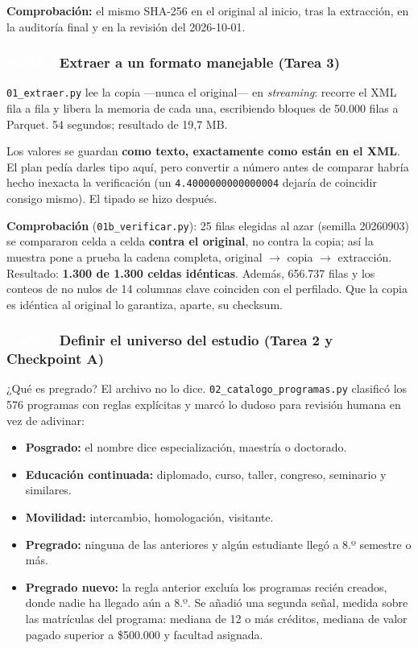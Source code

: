 \documentclass[11pt,a4paper,twoside,twocolumn]{article}
\newcommand{\cod}[1]{\nolinkurl{#1}}
\newcommand{\paso}[2]{\subsubsection*{\colorbox{ustaAzul}{\textcolor{white}{\scriptsize\sffamily\bfseries PASO #1}}\enspace #2}}
\begin{document}
\textbf{Comprobación:} el mismo SHA-256 en el original al inicio, tras la extracción, en la
auditoría final y en la revisión del 2026-10-01.

\paso{2}{Extraer a un formato manejable (Tarea 3)}

\cod{01_extraer.py} lee la copia ---nunca el original--- en \emph{streaming}: recorre el XML fila
a fila y libera la memoria de cada una, escribiendo bloques de 50.000 filas a Parquet.
54 segundos; resultado de 19,7 MB.

Los valores se guardan \textbf{como texto, exactamente como están en el XML}. El plan pedía darles
tipo aquí, pero convertir a número antes de comparar habría hecho inexacta la verificación (un
\cod{4.4000000000000004} dejaría de coincidir consigo mismo). El tipado se hizo después.

\textbf{Comprobación} (\cod{01b_verificar.py}): 25 filas elegidas al azar (semilla 20260903) se
compararon celda a celda \textbf{contra el original}, no contra la copia; así la muestra pone a
prueba la cadena completa, original $\to$ copia $\to$ extracción. Resultado: \textbf{1.300 de
1.300 celdas idénticas}. Además, 656.737 filas y los conteos de no nulos de 14 columnas clave
coinciden con el perfilado. Que la copia es idéntica al original lo garantiza, aparte, su
checksum.

\paso{3}{Definir el universo del estudio (Tarea 2 y Checkpoint A)}

¿Qué es pregrado? El archivo no lo dice. \cod{02_catalogo_programas.py} clasificó los 576
programas con reglas explícitas y marcó lo dudoso para revisión humana en vez de adivinar:

\begin{itemize}[leftmargin=*,itemsep=1pt,topsep=0pt]
  \item \textbf{Posgrado:} el nombre dice especialización, maestría o doctorado.
  \item \textbf{Educación continuada:} diplomado, curso, taller, congreso, seminario y similares.
  \item \textbf{Movilidad:} intercambio, homologación, visitante.
  \item \textbf{Pregrado:} ninguna de las anteriores y algún estudiante llegó a 8.º semestre o más.
  \item \textbf{Pregrado nuevo:} la regla anterior excluía los programas recién creados, donde
  nadie ha llegado aún a 8.º. Se añadió una segunda señal, medida sobre las matrículas del
  programa: mediana de 12 o más créditos, mediana de valor pagado superior a \$500.000 y
  facultad asignada.
\end{itemize}
\end{document}
